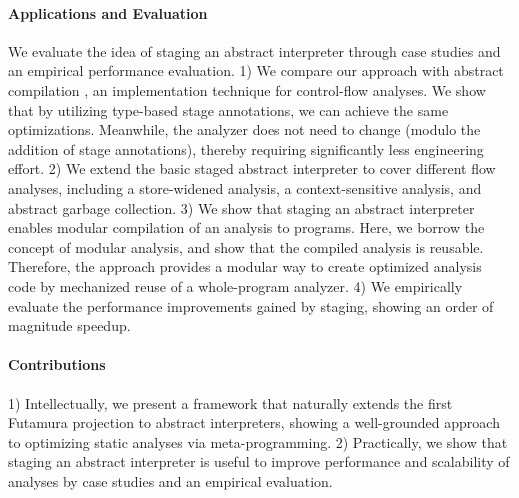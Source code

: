 \paragraph{Applications and Evaluation}
We evaluate the idea of staging an abstract interpreter through
case studies and an empirical performance evaluation.
1) We compare our approach with abstract compilation
\cite{Boucher:1996:ACN:647473.727587}, an implementation technique for
control-flow analyses. We show that by utilizing type-based stage
annotations, we can achieve the same optimizations. Meanwhile,
the analyzer does not need to change (modulo the addition of stage annotations),
thereby requiring significantly less engineering effort.
2) We extend the basic staged abstract interpreter to cover different flow
analyses, including a store-widened analysis, a context-sensitive
analysis, and abstract garbage collection.
3) We show that staging an abstract interpreter enables modular
compilation of an analysis to programs. Here, we borrow the concept of
modular analysis, and show that the compiled analysis is reusable.
Therefore, the approach provides a modular way to create optimized
analysis code by mechanized reuse of a whole-program analyzer.
4) We empirically evaluate the performance improvements gained by staging,
showing an order of magnitude speedup.

\paragraph{Contributions} 
1) Intellectually, we present a framework that naturally extends the first
Futamura projection to abstract interpreters, showing a well-grounded approach
to optimizing static analyses via meta-programming.  2) Practically, we show
that staging an abstract interpreter is useful to improve performance and
scalability of analyses by case studies and an empirical evaluation.


